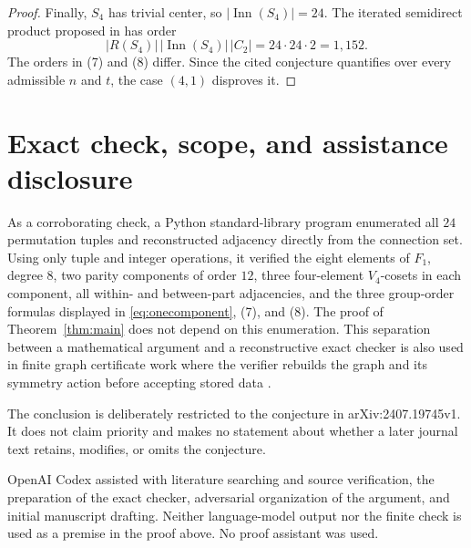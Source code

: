 \documentclass[11pt]{article}
\begin{document}
\begin{proof}
Finally, $S_4$ has trivial center, so
$|\operatorname{Inn}(S_4)|=24$.  The iterated semidirect product proposed
in \cite[Conjecture~3.1]{Pan2024} has order
\[
 |R(S_4)|\,|\operatorname{Inn}(S_4)|\,|C_2|
 =24\cdot24\cdot2=1{,}152. \tag{8}
\]
The orders in (7) and (8) differ.  Since the cited conjecture quantifies
over every admissible $n$ and $t$, the case $(4,1)$ disproves it.
\end{proof}

\section{Exact check, scope, and assistance disclosure}

As a corroborating check, a Python standard-library program enumerated
all $24$ permutation tuples and reconstructed adjacency directly from
the connection set.  Using only tuple and integer operations, it verified
the eight elements of $F_1$, degree $8$, two parity components of order
$12$, three four-element $V_4$-cosets in each component, all within- and
between-part adjacencies, and the three group-order formulas displayed in
\eqref{eq:onecomponent}, (7), and (8).  The proof of
Theorem~\ref{thm:main} does not depend on this enumeration.  This
separation between a mathematical
argument and a reconstructive exact checker is also used in finite graph
certificate work where the verifier rebuilds the graph and its symmetry
action before accepting stored data \cite[Sections~2 and~6]{ZengEtAl2026}.

The conclusion is deliberately restricted to the conjecture in
arXiv:2407.19745v1.  It does not claim priority and makes no statement
about whether a later journal text retains, modifies, or omits the
conjecture.

OpenAI Codex assisted with literature searching and source verification,
the preparation of the exact checker, adversarial organization of the
argument, and initial manuscript drafting.  Neither language-model output
nor the finite check is used as a premise in the proof above.  No proof
assistant was used.

\raggedright


\end{document}
